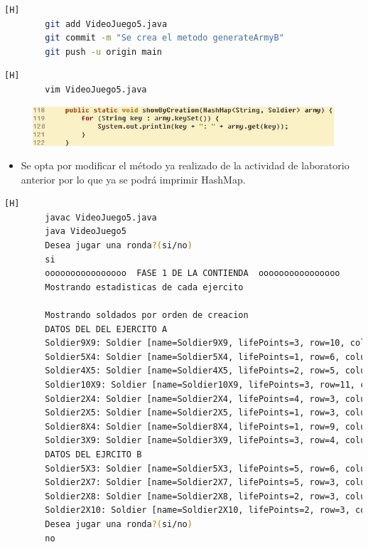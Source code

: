 \documentclass{article}
\begin{document}
	\begin{lstlisting}[language=bash,caption={Commit: c78e6ca75a2f9f69cc4559c9a8b598596b86b947}][H]
		git add VideoJuego5.java
		git commit -m "Se crea el metodo generateArmyB"			
		git push -u origin main
	\end{lstlisting}
		
	
	
	
	
	\begin{lstlisting}[language=bash,caption={Se modifica el método que imprime los datos de ambos ejércitos }][H]
		vim VideoJuego5.java
	\end{lstlisting}
	
	\begin{figure}[H]
		\centering
		\includegraphics[width=1\textwidth,keepaspectratio]{img/showByCreation.jpg}
	\end{figure}
	
	\begin{itemize}	
		\item Se opta por modificar el método ya realizado de la actividad de laboratorio anterior por lo que ya se podrá imprimir HashMap.
	\end{itemize}
	
	
	\begin{lstlisting}[language=bash,caption={ Probando los métodos}][H]
		javac VideoJuego5.java
		java VideoJuego5
		Desea jugar una ronda?(si/no)
		si
		oooooooooooooooo  FASE 1 DE LA CONTIENDA  oooooooooooooooo
		Mostrando estadisticas de cada ejercito
		
		Mostrando soldados por orden de creacion
		DATOS DEL DEL EJERCITO A
		Soldier9X9: Soldier [name=Soldier9X9, lifePoints=3, row=10, column=10]
		Soldier5X4: Soldier [name=Soldier5X4, lifePoints=1, row=6, column=5]
		Soldier4X5: Soldier [name=Soldier4X5, lifePoints=2, row=5, column=6]
		Soldier10X9: Soldier [name=Soldier10X9, lifePoints=3, row=11, column=10]
		Soldier2X4: Soldier [name=Soldier2X4, lifePoints=4, row=3, column=5]
		Soldier2X5: Soldier [name=Soldier2X5, lifePoints=1, row=3, column=6]
		Soldier8X4: Soldier [name=Soldier8X4, lifePoints=1, row=9, column=5]
		Soldier3X9: Soldier [name=Soldier3X9, lifePoints=3, row=4, column=10]
		DATOS DEL EJRCITO B
		Soldier5X3: Soldier [name=Soldier5X3, lifePoints=5, row=6, column=4]
		Soldier2X7: Soldier [name=Soldier2X7, lifePoints=5, row=3, column=8]
		Soldier2X8: Soldier [name=Soldier2X8, lifePoints=2, row=3, column=9]
		Soldier2X10: Soldier [name=Soldier2X10, lifePoints=2, row=3, column=11]
		Desea jugar una ronda?(si/no)
		no
		
	\end{lstlisting}
	
\end{document}
